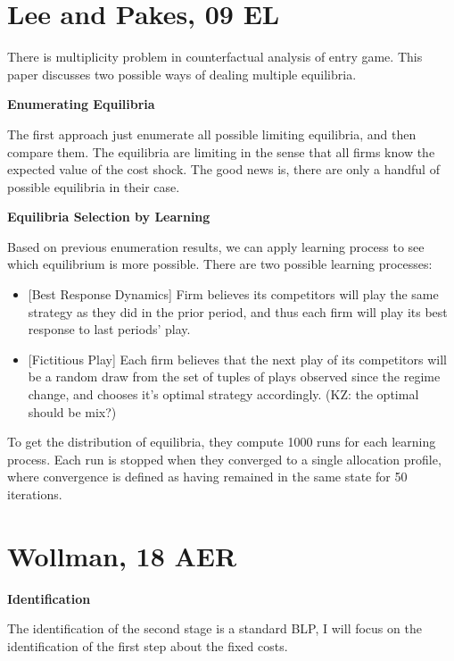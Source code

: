 \documentclass{book}
\theoremstyle{plain}
\theoremstyle{definition}
\newcommand{\mytitle}[1]{{\large{\textbf{#1}}}}
\begin{document}

\section{Lee and Pakes, 09 EL}
\label{sec:lee_pakes_09_el}

There is multiplicity problem in counterfactual analysis of entry game. This paper discusses two possible ways of dealing multiple equilibria.

\mytitle{Enumerating Equilibria}

The first approach just enumerate all possible limiting equilibria, and then compare them. 
The equilibria are limiting in the sense that all firms know the expected value of the cost shock.
The good news is, there are only a handful of possible equilibria in their case.

\mytitle{Equilibria Selection by Learning}

Based on previous enumeration results, we can apply learning process to see which equilibrium is more possible. There are two possible learning processes:
\begin{itemize}
	\item {[Best Response Dynamics]} Firm believes its competitors will play the same strategy as they did in the prior period, and thus each firm will play its best response to last periods' play.

	\item {[Fictitious Play]} Each firm believes that the next play of its competitors will be a random draw from the set of tuples of plays observed since the regime change, and chooses it's optimal strategy accordingly. (KZ: the optimal should be mix?)
\end{itemize}

To get the distribution of equilibria, they compute 1000 runs for each learning process. Each run is stopped when they converged to a single allocation profile, where convergence is defined as having remained in the same state for 50 iterations.

\section{Wollman, 18 AER} %
\label{sec:wollman_18_aer}

\mytitle{Identification}

The identification of the second stage is a standard BLP, I will focus on the identification of the first step about the fixed costs.
\end{document}
